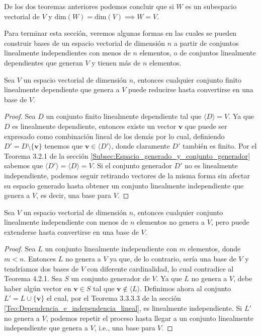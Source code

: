 \documentclass[12pt,dvipsnames]{article}
\newenvironment{teorema}[2][Teorema]{\begin{trivlist}
\item[\hskip \labelsep {\bfseries #1}\hskip \labelsep {\bfseries #2.}]}{\end{trivlist}}
\newenvironment{corolario}[2][Corolario]{\begin{trivlist}
\item[\hskip \labelsep {\bfseries #1}]}{\end{trivlist}}
\begin{document}
\begin{corolario}{4.2}
    De los dos teoremas anteriores podemos concluir que si $W$ es un subespacio vectorial de $V$ y $\text{dim}(W)=\text{dim}(V)\implies W=V.$
\end{corolario}

Para terminar esta sección, veremos algunas formas en las cuales se pueden construir bases de un espacio vectorial de dimensión $n$ a partir de conjuntos linealmente independientes con menos de $n$ elementos, o de conjuntos linealmente dependientes que generan $V$ y tienen más de $n$ elementos.

\begin{teorema} {4.2.4}
    Sea $V$ un espacio vectorial de dimensión $n$, entonces cualquier conjunto finito linealmente dependiente que genera a $V$ puede reducirse hasta convertirse en una base de $V$.

\begin{proof}
    Sea $D$ un conjunto finito linealmente dependiente tal que $\langle D \rangle =V$. Ya que $D$ es linealmente dependiente, entonces existe un vector $\mathbf{v}$ que puede ser expresado como combinación lineal de los demás por lo cual, definiendo $D'=D\setminus\{\mathbf{v}\}$ tenemos que $\mathbf{v}\in\langle D' \rangle$, donde claramente $D'$ también es finito. Por el Teorema 3.2.1 de la sección \ref{Subsec:Espacio_generado_y_conjunto_generador} sabemos que $\langle D' \rangle =\langle D \rangle =V$. Si el conjunto generador $D'$ no es linealmente independiente, podemos seguir retirando vectores de la misma forma sin afectar su espacio generado hasta obtener un conjunto linealmente independiente que genera a $V$, es decir, una base para $V$.
\end{proof}

\end{teorema}

\begin{teorema} {4.2.5}
Sea $V$ un espacio vectorial de dimensión $n$, entonces cualquier conjunto linealmente independiente con menos de $n$ elementos no genera a $V$, pero puede extenderse hasta convertirse en una base de $V$.

\begin{proof}
Sea $L$ un conjunto linealmente independiente con $m$ elementos, donde $m<n$. Entonces $L$ no genera a $V$ ya que, de lo contrario, sería una base de $V$ y tendríamos dos bases de $V$ con diferente cardinalidad, lo cual contradice al Teorema 4.2.1. Sea $S$ un conjunto generador de $V$. Ya que $L$ no genera a $V$, debe haber algún vector en $\mathbf{v}\in S$ tal que $\mathbf{v}\notin \langle L \rangle$. Definimos ahora al conjunto $L'=L\cup \{\mathbf{v}\}$ el cual, por el Teorema 3.3.3.3 de la sección \ref{Teo:Dependencia_e_independencia_lineal}, es linealmente independiente. Si $L'$ no genera a $V$, podemos repetir el proceso hasta llegar a un conjunto linealmente independiente que genera a $V$, i.e., una base para $V$.
\end{proof}

\end{teorema}
\end{document}

